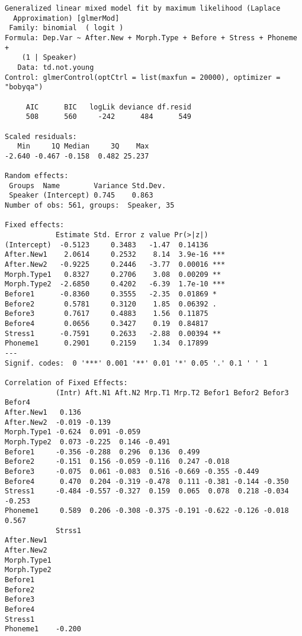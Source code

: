 \documentclass[
  10pt,
  letterpaper]{article}
\begin{document}
\begin{verbatim}
Generalized linear mixed model fit by maximum likelihood (Laplace
  Approximation) [glmerMod]
 Family: binomial  ( logit )
Formula: Dep.Var ~ After.New + Morph.Type + Before + Stress + Phoneme +  
    (1 | Speaker)
   Data: td.not.young
Control: glmerControl(optCtrl = list(maxfun = 20000), optimizer = "bobyqa")

     AIC      BIC   logLik deviance df.resid 
     508      560     -242      484      549 

Scaled residuals: 
   Min     1Q Median     3Q    Max 
-2.640 -0.467 -0.158  0.482 25.237 

Random effects:
 Groups  Name        Variance Std.Dev.
 Speaker (Intercept) 0.745    0.863   
Number of obs: 561, groups:  Speaker, 35

Fixed effects:
            Estimate Std. Error z value Pr(>|z|)    
(Intercept)  -0.5123     0.3483   -1.47  0.14136    
After.New1    2.0614     0.2532    8.14  3.9e-16 ***
After.New2   -0.9225     0.2446   -3.77  0.00016 ***
Morph.Type1   0.8327     0.2706    3.08  0.00209 ** 
Morph.Type2  -2.6850     0.4202   -6.39  1.7e-10 ***
Before1      -0.8360     0.3555   -2.35  0.01869 *  
Before2       0.5781     0.3120    1.85  0.06392 .  
Before3       0.7617     0.4883    1.56  0.11875    
Before4       0.0656     0.3427    0.19  0.84817    
Stress1      -0.7591     0.2633   -2.88  0.00394 ** 
Phoneme1      0.2901     0.2159    1.34  0.17899    
---
Signif. codes:  0 '***' 0.001 '**' 0.01 '*' 0.05 '.' 0.1 ' ' 1

Correlation of Fixed Effects:
            (Intr) Aft.N1 Aft.N2 Mrp.T1 Mrp.T2 Befor1 Befor2 Befor3 Befor4
After.New1   0.136                                                        
After.New2  -0.019 -0.139                                                 
Morph.Type1 -0.624  0.091 -0.059                                          
Morph.Type2  0.073 -0.225  0.146 -0.491                                   
Before1     -0.356 -0.288  0.296  0.136  0.499                            
Before2     -0.151  0.156 -0.059 -0.116  0.247 -0.018                     
Before3     -0.075  0.061 -0.083  0.516 -0.669 -0.355 -0.449              
Before4      0.470  0.204 -0.319 -0.478  0.111 -0.381 -0.144 -0.350       
Stress1     -0.484 -0.557 -0.327  0.159  0.065  0.078  0.218 -0.034 -0.253
Phoneme1     0.589  0.206 -0.308 -0.375 -0.191 -0.622 -0.126 -0.018  0.567
            Strss1
After.New1        
After.New2        
Morph.Type1       
Morph.Type2       
Before1           
Before2           
Before3           
Before4           
Stress1           
Phoneme1    -0.200
\end{verbatim}
\end{document}
